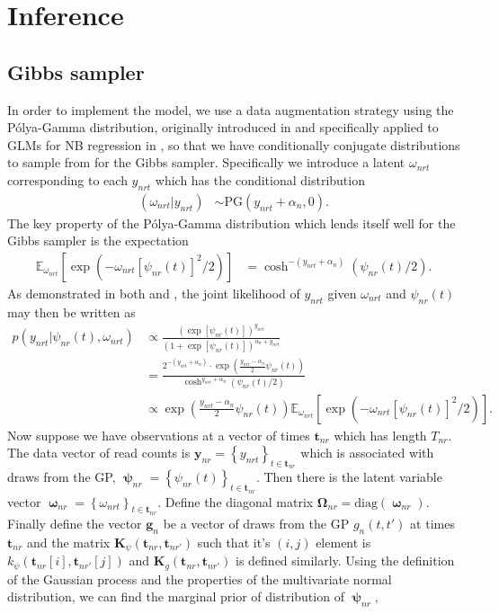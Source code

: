 \documentclass[11pt]{article}
\newcommand{\1}{\mathbf{1}}
\newcommand{\0}{\mathbf{0}}
\newcommand{\K}{\mathbf{K}}
\newcommand{\g}{\mathbf{g}}
\newcommand{\y}{\mathbf{y}}
\begin{document}
\section{Inference}\label{Inference}

\subsection{Gibbs sampler}

In order to implement the model, we use a data augmentation strategy using the P\'{o}lya-Gamma distribution, originally introduced in \cite{PG} and specifically applied to GLMs for NB regression in \cite{NBregression}, so that we have conditionally conjugate distributions to sample from for the Gibbs sampler. Specifically we introduce a latent $\omega_{nrt}$ corresponding to each $y_{nrt}$ which has the conditional distribution
%
%
%
\begin{align*}
	(\omega_{nrt} | y_{nrt}) &\sim \text{PG}(y_{nrt} + \alpha_{n}, 0).
\end{align*}
%
%
%
The key property of the P\'{o}lya-Gamma distribution which lends itself well for the Gibbs sampler is the expectation 
%
%
%
\begin{align*}
	\mathbb{E}_{\omega_{nrt}}\left[ \exp\left( -\omega_{nrt}\left[ \psi_{nr}(t) \right]^2 / 2 \right) \right] &= \cosh^{-(y_{nrt} + \alpha_{n})}(\psi_{nr}(t) / 2).
\end{align*}
%
%
%
As demonstrated in both \cite{PG} and \cite{NBregression}, the joint likelihood of $y_{nrt}$ given $\omega_{nrt}$ and $\psi_{nr}(t)$ may then be written as
%
%
%
\begin{align*}
	p(y_{nrt} | \psi_{nr}(t), \omega_{nrt}) &\propto \frac{ \left( \exp\left[ \psi_{nr}(t) \right] \right)^{y_{nrt}}}{\left( 1 +  \exp\left[ \psi_{nr}(t) \right] \right)^{\alpha_{n} + y_{nrt}}} \\
	&= \frac{2^{-(y_{nrt} + \alpha_{n})} \cdot \exp\left( \frac{y_{nrt} - \alpha_{n}}{2} \psi_{nr}(t) \right)}{\cosh^{y_{nrt} + \alpha_{n}}(\psi_{nr}(t) / 2)} \\
	&\propto \exp\left( \frac{y_{nrt} - \alpha_{n}}{2} \psi_{nr}(t) \right) \mathbb{E}_{\omega_{nrt}}\left[ \exp\left( -\omega_{nrt}\left[ \psi_{nr}(t) \right]^2 / 2 \right) \right].
\end{align*}
%
%
%
Now suppose we have observations at a vector of times $\mathbf{t}_{nr}$ which has length $T_{nr}$. The data vector of read counts is $\y_{nr} = \left\{ y_{nrt} \right\}_{t\in\mathbf{t}_{nr}}$ which is associated with draws from the GP, $\bm{\uppsi}_{nr} = \left\{ \psi_{nr}(t) \right\}_{t\in\mathbf{t}_{nr}}$. Then there is the latent variable vector $\bm{\upomega}_{nr} = \left\{ \omega_{nrt} \right\}_{t\in\mathbf{t}_{nr}}$. Define the diagonal matrix $\bm{\Omega}_{nr} = \text{diag}\left( \bm{\upomega}_{nr} \right).$ Finally define the vector $\g_n$ be a vector of draws from the GP $g_n(t, t')$ at times $\mathbf{t}_{nr}$ and the matrix $\K_\psi(\mathbf{t}_{nr}, \mathbf{t}_{nr'})$ such that it's $(i, j)$ element is $k_\psi(\mathbf{t}_{nr}[i], \mathbf{t}_{nr'}[j])$ and $\K_g(\mathbf{t}_{nr}, \mathbf{t}_{nr'})$ is defined similarly. Using the definition of the Gaussian process and the properties of the multivariate normal distribution, we can find the marginal prior of distribution of $\bm{\uppsi}_{nr},$  
\end{document}
